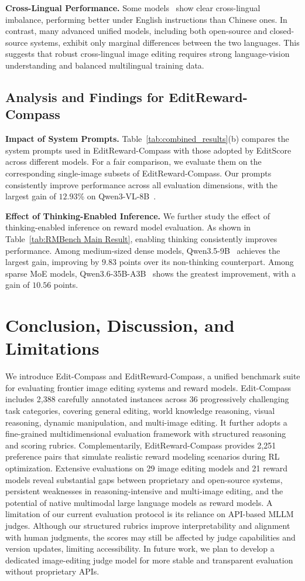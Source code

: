 \documentclass{llmxive}
\providecommand{\bench}{Edit-Compass}
\providecommand{\rmbench}{EditReward-Compass}
\begin{document}
\textbf{Cross-Lingual Performance.}
Some models~\cite{li2025uniworld,labs2025flux} show clear cross-lingual imbalance, performing better under English instructions than Chinese ones. In contrast, many advanced unified models, including both open-source and closed-source systems, exhibit only marginal differences between the two languages. This suggests that robust cross-lingual image editing requires strong language-vision understanding and balanced multilingual training data.

\subsection{Analysis and Findings for {\rmbench}}

\textbf{Impact of System Prompts.}
Table~\ref{tab:combined_results}(b) compares the system prompts used in {\rmbench} with those adopted by EditScore across different models. For a fair comparison, we evaluate them on the corresponding single-image subsets of {\rmbench}. Our prompts consistently improve performance across all evaluation dimensions, with the largest gain of $12.93$\% on Qwen3-VL-8B~\cite{bai2025qwen3}.

\textbf{Effect of Thinking-Enabled Inference.}
We further study the effect of thinking-enabled inference on reward model evaluation. As shown in Table~\ref{tab:RMBench Main Result}, enabling thinking consistently improves performance. Among medium-sized dense models, Qwen3.5-9B~\cite{qwen3.5} achieves the largest gain, improving by $9.83$ points over its non-thinking counterpart. Among sparse MoE models, Qwen3.6-35B-A3B~\citep{qwen36_35b_a3b} shows the greatest improvement, with a gain of $10.56$ points.

\section{Conclusion, Discussion, and Limitations}
\label{sec:conclusion}
We introduce {\bench} and {\rmbench}, a unified benchmark suite for evaluating frontier image editing systems and reward models. {\bench} includes 2,388 carefully annotated instances across 36 progressively challenging task categories, covering general editing, world knowledge reasoning, visual reasoning, dynamic manipulation, and multi-image editing. It further adopts a fine-grained multidimensional evaluation framework with structured reasoning and scoring rubrics. Complementarily, {\rmbench} provides 2,251 preference pairs that simulate realistic reward modeling scenarios during RL optimization. Extensive evaluations on 29 image editing models and 21 reward models reveal substantial gaps between proprietary and open-source systems, persistent weaknesses in reasoning-intensive and multi-image editing, and the potential of native multimodal large language models as reward models.
A limitation of our current evaluation protocol is its reliance on API-based MLLM judges. Although our structured rubrics improve interpretability and alignment with human judgments, the scores may still be affected by judge capabilities and version updates, limiting accessibility. In future work, we plan to develop a dedicated image-editing judge model for more stable and transparent evaluation without proprietary APIs.
\end{document}
